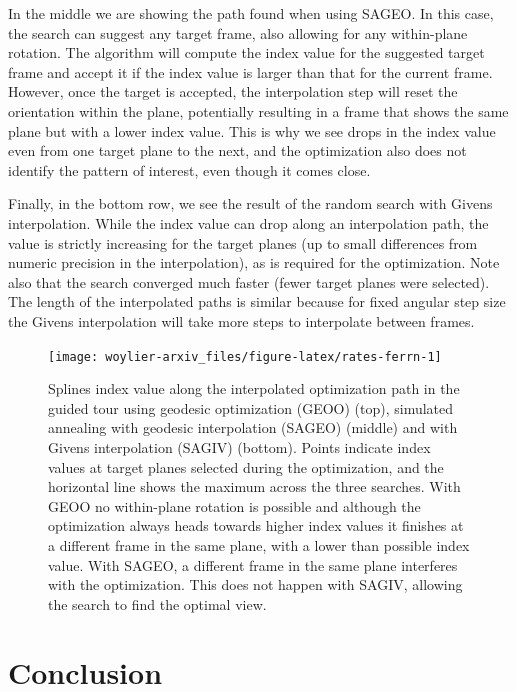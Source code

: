 \documentclass{article}
\begin{document}
In the middle we are showing the path found when using SAGEO. In this
case, the search can suggest any target frame, also allowing for any
within-plane rotation. The algorithm will compute the index value for
the suggested target frame and accept it if the index value is larger
than that for the current frame. However, once the target is accepted,
the interpolation step will reset the orientation within the plane,
potentially resulting in a frame that shows the same plane but with a
lower index value. This is why we see drops in the index value even from
one target plane to the next, and the optimization also does not
identify the pattern of interest, even though it comes close.

Finally, in the bottom row, we see the result of the random search with
Givens interpolation. While the index value can drop along an
interpolation path, the value is strictly increasing for the target
planes (up to small differences from numeric precision in the
interpolation), as is required for the optimization. Note also that the
search converged much faster (fewer target planes were selected). The
length of the interpolated paths is similar because for fixed angular
step size the Givens interpolation will take more steps to interpolate
between frames.

\begin{figure}

{\centering \texttt{[image: woylier-arxiv\_files/figure-latex/rates-ferrn-1]} 

}

\caption{Splines index value along the interpolated optimization path in the guided tour using geodesic optimization (GEOO) (top), simulated annealing with geodesic interpolation  (SAGEO) (middle) and with Givens interpolation (SAGIV) (bottom). Points indicate index values at target planes selected during the optimization, and the horizontal line shows the maximum across the three searches. With GEOO no within-plane rotation is possible and although the optimization always heads towards higher index values it finishes at a different frame in the same plane, with a lower than possible index value. With SAGEO, a different frame in the same plane interferes with the optimization. This does not happen with SAGIV, allowing the search to find the optimal view.}\label{fig:rates-ferrn}
\end{figure}

\hypertarget{conclusion}{%
\section{Conclusion}\label{conclusion}}
\end{document}
